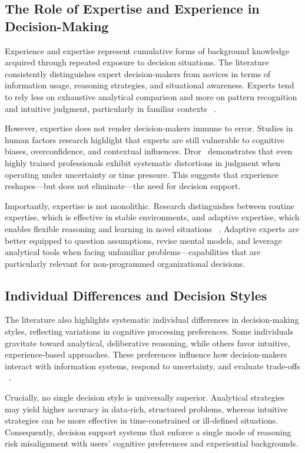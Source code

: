 \documentclass{sfuthesis}
\begin{document}
\subsection{The Role of Expertise and Experience in Decision-Making}
Experience and expertise represent cumulative forms of background knowledge acquired through repeated exposure to decision situations. The literature consistently distinguishes expert decision-makers from novices in terms of information usage, reasoning strategies, and situational awareness. Experts tend to rely less on exhaustive analytical comparison and more on pattern recognition and intuitive judgment, particularly in familiar contexts ~\cite{klein1997developing, hutton_expert_1999}.\par
However, expertise does not render decision-makers immune to error. Studies in human factors research highlight that experts are still vulnerable to cognitive biases, overconfidence, and contextual influences. Dror~\cite{dror_cognitive_2020} demonstrates that even highly trained professionals exhibit systematic distortions in judgment when operating under uncertainty or time pressure. This suggests that experience reshapes—but does not eliminate—the need for decision support.\par
Importantly, expertise is not monolithic. Research distinguishes between routine expertise, which is effective in stable environments, and adaptive expertise, which enables flexible reasoning and learning in novel situations ~\cite{croskerry_adaptive_2018}. Adaptive experts are better equipped to question assumptions, revise mental models, and leverage analytical tools when facing unfamiliar problems—capabilities that are particularly relevant for non-programmed organizational decisions.
\subsection{Individual Differences and Decision Styles}
The literature also highlights systematic individual differences in decision-making styles, reflecting variations in cognitive processing preferences. Some individuals gravitate toward analytical, deliberative reasoning, while others favor intuitive, experience-based approaches. These preferences influence how decision-makers interact with information systems, respond to uncertainty, and evaluate trade-offs ~\cite{parker-tomlin_factors_2019}.\par
Crucially, no single decision style is universally superior. Analytical strategies may yield higher accuracy in data-rich, structured problems, whereas intuitive strategies can be more effective in time-constrained or ill-defined situations. Consequently, decision support systems that enforce a single mode of reasoning risk misalignment with users’ cognitive preferences and experiential backgrounds.
\end{document}
